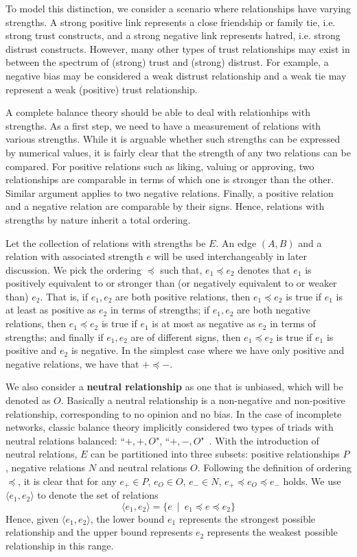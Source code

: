 \documentclass[acmtweb]{acmsmall}
\newcommand{\tuple}[2] {\langle #1,#2\rangle}
\begin{document}
To model this distinction, we consider a scenario where relationships
have varying strengths. A strong positive link represents a close
friendship or family tie, i.e. strong trust constructs, and a strong
negative link represents hatred, i.e. strong distrust
constructs. However, many other types of trust relationships may exist
in between the spectrum of (strong) trust and (strong) distrust. For
example, a negative bias may be considered a weak distrust
relationship and a weak tie may represent a weak (positive) trust
relationship.
 
A complete balance theory should be able to deal with relationhips
with strengths.  As a first step, we need to have a measurement of
relations with various strengths. While it is arguable whether
such strengths can be expressed by numerical values, it is fairly
clear that the strength of any two relations can be compared. For
positive relations such as liking, valuing or approving, two
relationships are comparable in terms of which one is stronger than
the other. Similar argument applies to two negative
relations. Finally, a positive relation and a negative relation are
comparable by their signs. Hence, relations with strengths by nature
inherit a total ordering.
 
Let the collection of relations with strengths be $E$. An edge $(A,B)$
and a relation with associated strength $e$ will be used
interchangeably in later discussion. We pick the ordering $\preceq$
such that, $e_{1} \preceq e_{2}$ denotes that $e_{1}$ is positively
equivalent to or stronger than (or negatively equivalent to or weaker
than) $e_{2}$. That is, if $e_{1}, e_{2}$ are both positive relations,
then $e_{1} \preceq e_{2}$ is true if $e_{1}$ is at least as positive
as $e_{2}$ in terms of strengths; if $e_{1}, e_{2}$ are both negative
relations, then $e_{1} \preceq e_{2}$ is true if $e_{1}$ is at most as
negative as $e_{2}$ in terms of strengths; and finally if $e_{1},
e_{2}$ are of different signs, then $e_{1} \preceq e_{2}$ is true if
$e_{1}$ is positive and $e_{2}$ is negative. In the simplest case
where we have only positive and negative relations, we have that $+
\preceq -$.
 
We also consider a {\bf neutral relationship} as one that is unbiased,
which will be denoted as $O$. Basically a neutral relationship is a
non-negative and non-positive relationship, corresponding to no
opinion and no bias. In the case of incomplete networks,  classic balance theory implicitly considered two types of triads with
neutral relations balanced: ``$+, +, O$",
``$+,-,O$"~\cite{kleinberg-book}. With the introduction of neutral
relations, $E$ can be partitioned into three subsets: positive
relationships $P$, negative relations $N$ and neutral relations
$O$. Following the definition of ordering $\preceq$, it is clear that
for any $e_{+} \in P$, $e_{O} \in O$, $e_{-} \in N$, $e_{+} \preceq
e_{O} \preceq e_{-}$ holds. We use $\tuple{e_1}{e_2}$ to denote the
set of relations 
\[\tuple{e_1}{e_2} = \{e\:\mid\: e_1\preceq e\preceq e_2\} \] 
Hence, given $\tuple{e_1}{e_2}$, the lower bound $e_1$
represents the strongest possible relationship and the upper bound
represents $e_2$ represents the weakest possible relationship in this
range.
 
\end{document}
